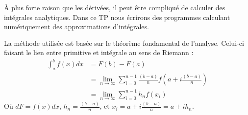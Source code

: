 
À plus forte raison que les dérivées, il peut être  compliqué de calculer
des intégrales analytiques. Dans ce TP nous écrirons des programmes
calculant numériquement des approximations d'intégrales.

La méthode utilisée est basée sur le théorème fondamental de l'analyse.
Celui-ci faisant le lien entre primitive et intégrale au sens de Riemann :
\begin{equation}
\begin{split}
\int_a^b f(x)dx &= F(b)-F(a) \\
                &= \lim_{n\rightarrow\infty} \sum_{i=0}^{n-1}\frac{(b-a)}{n} f(a+i\frac{(b-a)}{n})\\
                &= \lim_{n\rightarrow\infty} \sum_{i=0}^{n-1} h_n f(x_i)
\end{split}
\end{equation}
Où $dF = f(x)dx$, $h_n=\frac{(b-a)}{n}$, et $x_i=a+ i\frac{(b-a)}{n} = a+ih_n$.

\begin{center}
\end{center}

